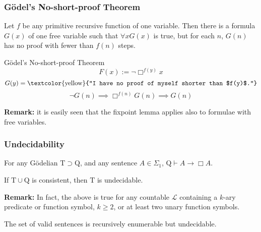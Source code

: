 \documentclass[UTF8,aspectratio=43,11pt,colorlinks,compress,openany]{beamer}%
\begin{document}
\begin{frame}\frametitle{G\"odel's No-short-proof Theorem}
\setlength\abovedisplayskip{0pt}
\setlength\belowdisplayskip{0pt}\vspace{-1ex}
	\begin{theorem}
		Let $f$ be any primitive recursive function of one variable. Then there is a formula $G(x)$ of one free variable such that $\forall x G(x)$ is true, but for each $n$, $G(n)$ has no proof with fewer than $f(n)$ steps.
	\end{theorem}
	\begin{block}{G\"odel's No-short-proof Theorem}
		\[F(x):=\neg\Box ^{f(y)} x\]
		\[G(y)=\text{\textcolor{yellow}{``I have no proof of myself shorter than $f(y)$.''}}\]	
		\[\neg G(n)\implies\Box ^{f(n)} G(n)\implies G(n)\]
	\end{block}
	\textbf{Remark:} it is easily seen that the fixpoint lemma applies also to formulae with free variables.
	\begin{center}
	\end{center}
\end{frame}

\begin{frame}\frametitle{Undecidability}
\setlength\abovedisplayskip{0pt}
\setlength\belowdisplayskip{0pt}
	\begin{center}
	\end{center}
	\begin{theorem}
		For any G\"odelian $\mathrm{T}\supset \mathrm{Q}$, and any sentence $A\in\Sigma_1$, $\mathrm{Q}\vdash A\to\Box A$.
	\end{theorem}
	\begin{theorem}
		If $\mathrm{T}\cup \mathrm{Q}$ is consistent, then $\mathrm{T}$ is undecidable.
	\end{theorem}
	\textbf{Remark:} In fact, the above is true for any countable $\mathscr{L}$ containing a $k$-ary predicate or function symbol, $k\geq 2$, or at least two unary function symbols.
	\begin{center}
	\end{center}
	\begin{theorem}
		The set of valid sentences is recursively enumerable but undecidable.
	\end{theorem}
\end{frame}
\end{document}
